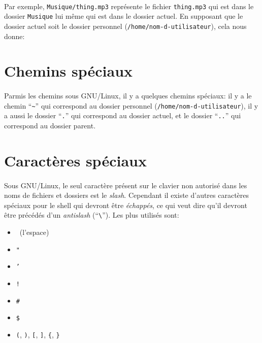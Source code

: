 \documentclass[french, a4paper, 12pt, titlepage]{article}
\begin{document}
\paragraph{} Par exemple, \texttt{Musique/thing.mp3} représente le fichier
\texttt{thing.mp3} qui est dans le dossier \texttt{Musique} lui même qui est
dans le dossier actuel. En supposant que le dossier actuel soit le dossier
personnel (\texttt{/home/nom-d-utilisateur}), cela nous donne:
\\

\section{Chemins spéciaux}

\paragraph{} Parmis les chemins sous GNU/Linux, il y a quelques chemins
spéciaux: il y a le chemin ``\texttt{\~}'' qui correspond au dossier personnel
(\texttt{/home/nom-d-utilisateur}), il y a aussi le dossier ``\texttt{.}'' qui
correspond au dossier actuel, et le dossier ``\texttt{..}'' qui correspond au
dossier parent.

\section{Caractères spéciaux}

\paragraph{} Sous GNU/Linux, le seul caractère présent sur le clavier non
autorisé dans les noms de fichiers et dossiers est le \emph{slash}. Cependant
il existe d'autres caractères spéciaux pour le shell qui devront être
\emph{échappés}, ce qui veut dire qu'il devront être précédés d'un
\emph{antislash} (``\texttt{\textbackslash}''). Les plus utilisés sont:

\begin{itemize}
	\item \textvisiblespace~(l'espace)
	\item \texttt{"}
	\item \texttt{'}
	\item \texttt{!}
	\item \texttt{\#}
	\item \texttt{\$}
	\item \texttt{(}, \texttt{)}, \texttt{[}, \texttt{]}, \texttt{\{}, \texttt{\}}
\end{itemize}
\end{document}
